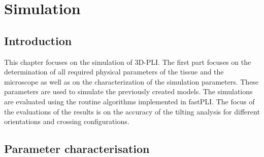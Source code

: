 \cleardoublepage
\setcounter{chapter}{7}
\chapter{Simulation}
\label{cha:simulation_analysis}
%
%
\section{Introduction}
%
This chapter focuses on the simulation of \ac{3D-PLI}.
The first part focuses on the determination of all required physical parameters of the tissue and the microscope as well as on the characterization of the simulation parameters.
These parameters are used to simulate the previously created models.
The simulations are evaluated using the routine algorithms implemented in \ac{fastPLI}.
The focus of the evaluations of the results is on the accuracy of the tilting analysis for different orientations and crossing configurations.
%
%
%
\section{Parameter characterisation}\label{sec:sim_choose_parameters}
%
